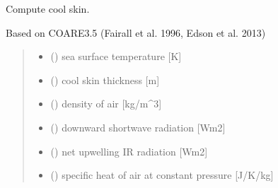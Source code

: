\documentclass[letterpaper,10pt,english]{sphinxmanual}
\begin{document}
\begin{fulllineitems}
\label{\detokenize{users_guide:AirSeaFluxCode.cs_wl_subs.cs}}
\pysigstartsignatures
\pysiglinewithargsret
{}
{\sphinxparamcomma {}\sphinxparamcomma {}\sphinxparamcomma {}\sphinxparamcomma {}\sphinxparamcomma {}\sphinxparamcomma {}\sphinxparamcomma {}\sphinxparamcomma {}\sphinxparamcomma {}\sphinxparamcomma {}\sphinxparamcomma {}}
{}
\pysigstopsignatures
\sphinxAtStartPar
Compute cool skin.

\sphinxAtStartPar
Based on COARE3.5 (Fairall et al. 1996, Edson et al. 2013)
\begin{quote}\begin{description}
\begin{itemize}
\item {}
\sphinxAtStartPar
{} () \textendash{} sea surface temperature      {[}K{]}

\item {}
\sphinxAtStartPar
{} () \textendash{} cool skin thickness           {[}m{]}

\item {}
\sphinxAtStartPar
{} () \textendash{} density of air               {[}kg/m\textasciicircum{}3{]}

\item {}
\sphinxAtStartPar
{} () \textendash{} downward shortwave radiation {[}Wm\sphinxhyphen{}2{]}

\item {}
\sphinxAtStartPar
{} () \textendash{} net upwelling IR radiation       {[}Wm\sphinxhyphen{}2{]}

\item {}
\sphinxAtStartPar
{} () \textendash{} specific heat of air at constant pressure {[}J/K/kg{]}


\end{itemize}
\end{description}
\end{quote}
\end{fulllineitems}
\end{document}
